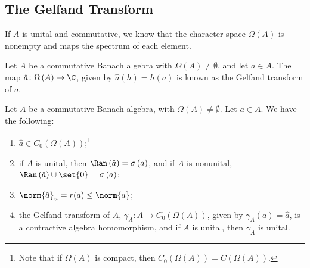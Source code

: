 \documentclass[10pt]{mypackage}
\begin{document}
\subsection{The Gelfand Transform}%
If $A$ is unital and commutative, we know that the character space $\Omega\left(A\right)$ is nonempty and maps the spectrum of each element.
\begin{definition}
  Let $A$ be a commutative Banach algebra with $\Omega\left(A\right)\neq \emptyset$, and let $a\in A$. The map $\hat{a}\colon \Omega\left(A\right)\rightarrow \C$, given by $\hat{a}\left(h\right) = h\left(a\right)$ is known as the Gelfand transform of $a$.
\end{definition}
\begin{proposition}
  Let $A$ be a commutative Banach algebra, with $\Omega\left(A\right) \neq \emptyset$. Let $a\in A$. We have the following:
  \begin{enumerate}[(1)]
    \item $\hat{a}\in C_0\left(\Omega\left(A\right)\right)$;\footnote{Note that if $\Omega\left(A\right)$ is compact, then $C_0\left(\Omega\left(A\right)\right) = C\left(\Omega\left(A\right)\right)$.}
    \item if $A$ is unital, then $\Ran\left(\hat{a}\right) = \sigma\left(a\right)$, and if $A$ is nonunital, $\Ran\left(\hat{a}\right) \cup \set{0} = \sigma\left(a\right)$;
    \item $\norm{\hat{a}}_u = r(a) \leq \norm{a}$;
    \item the Gelfand transform of $A$, $\gamma_A\colon A\rightarrow C_0\left(\Omega\left(A\right)\right)$, given by $\gamma_A\left(a\right)=  \hat{a}$, is a contractive algebra homomorphism, and if $A$ is unital, then $\gamma_A$ is unital.
  \end{enumerate}
\end{proposition}
\end{document}
